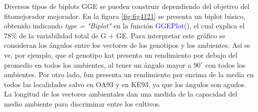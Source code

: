 Diversos tipos de biplots GGE se pueden construir dependiendo del objetivo del fitomejorador mejorador. En la figura \ref{fig:fig4121} se presenta un biplot básico, obtenido indicando \emph{type = "Biplot"} en la función \textcolor{blue}{GGEPlot}(), el cual explica el 78\% de la variabilidad total de G + GE. Para interpretar este gráfico se consideran los ángulos entre los vectores de los genotipos y los ambientes. Así se ve, por ejemplo, que el genotipo kat presenta un rendimiento por debajo del promedio en todos los ambientes, al tener un ángulo mayor a $90^{\circ}$ con todos los ambientes. Por otro lado, fun presenta un rendimiento por encima de la media en todos las localidades salvo en OA93 y en KE93, ya que los ángulos son agudos. La longitud de los vectores ambientales dan una medida de la capacidad del medio ambiente para discriminar entre los cultivos. 



